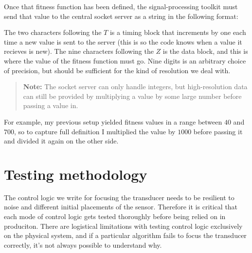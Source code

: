 \documentclass[11pt]{article}
\begin{document}
Once that fitness function has been defined, the signal-processing toolkit must send that value to the central socket server as a string in the following format:
\begin{center}\label{sec:data_format_fig}
\end{center}
The two characters following the $T$ is a timing block that increments by one each time a new value is sent to the server (this is so the code knows when a value it recieves is new). The nine characters following the $Z$ is the data block, and this is where the value of the fitness function must go. Nine digits is an arbitrary choice of precision, but should be sufficient for the kind of resolution we deal with.
\begin{quote}
    \textbf{Note:} The socket server can only handle integers, but high-resolution data can still be provided by multiplying a value by some large number before passing a value in.
\end{quote}
For example, my previous setup yielded fitness values in a range between $40$ and $700$, so to capture full definition I multiplied the value by $1000$ before passing it and divided it again on the other side.


\section{Testing methodology}
The control logic we write for focusing the transducer needs to be resilient to noise and different initial placements of the sensor. Therefore it is critical that each mode of control logic gets tested thoroughly before being relied on in produciton.
There are logistical limitations with testing control logic exclusively on the physical system, and if a particular algorithm fails to focus the transducer correctly, it's not always possible to understand why.
\end{document}
